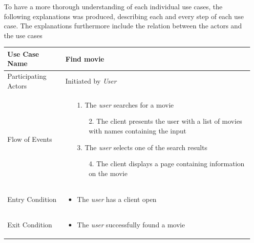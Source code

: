 To have a more thorough understanding of each individual use cases, the following explanations was produced, describing each and every step of each use case.
The explanations furthermore include the relation between the actors and the use cases


\begin{center}
	\begin{tabular}{ | l | p{10cm} |  }
		 \hline
		Use Case Name & Find movie \\ \hline
		Participating Actors & Initiated by \emph{User} \\ \hline
		Flow of Events & \begin{enumerate}
						\item[1.] The \emph{user} searches for a movie
						\begin{enumerate}
							\item[2.] The client presents the user with a list of movies with names containing the input
						\end{enumerate}
						\item[3.] The \emph{user} selects one of the search results
						\begin{enumerate}
							\item[4.] The client displays a page containing information on the movie
						\end{enumerate}
					\end{enumerate} \\ \hline
		Entry Condition & \begin{itemize}
						\item The \emph{user} has a client open
					\end{itemize} \\ \hline
		Exit Condition & \begin{itemize}
						\item The \emph{user} successfully found a movie
					\end{itemize} \\
		\hline
	\end{tabular}
\end{center}

